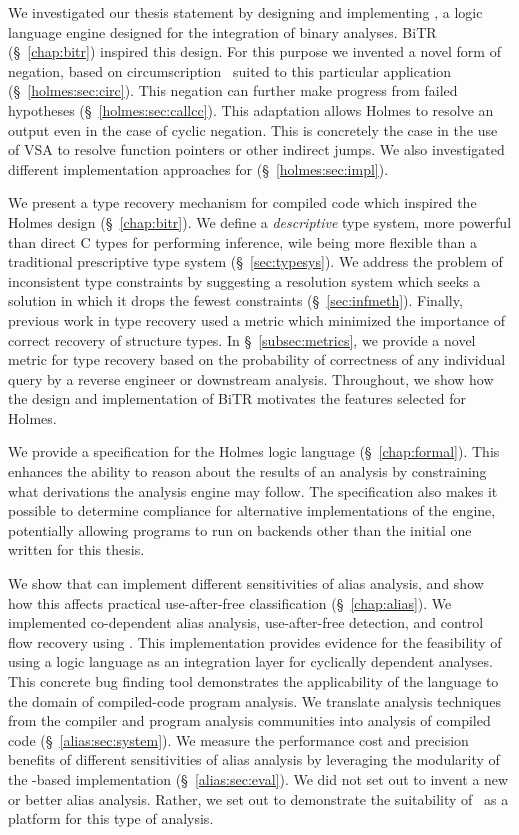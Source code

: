 We investigated our thesis statement by designing and implementing \sysname, a logic language engine designed for the integration of binary analyses.
BiTR (\S~\ref{chap:bitr}) inspired this design.
For this purpose we invented a novel form of negation, based on circumscription~\cite{circumscription} suited to this particular application (\S~\ref{holmes:sec:circ}).
This negation can further make progress from failed hypotheses (\S~\ref{holmes:sec:callcc}).
This adaptation allows Holmes to resolve an output even in the case of cyclic negation.
This is concretely the case in the use of VSA to resolve function pointers or other indirect jumps.
We also investigated different implementation approaches for \sysname (\S~\ref{holmes:sec:impl}).

We present a type recovery mechanism for compiled code which inspired the Holmes design (\S~\ref{chap:bitr}).
We define a \emph{descriptive} type system, more powerful than direct C types for performing inference, wile being more flexible than a traditional prescriptive type system (\S~\ref{sec:typesys}).
We address the problem of inconsistent type constraints by suggesting a resolution system which seeks a solution in which it drops the fewest constraints (\S~\ref{sec:infmeth}).
Finally, previous work in type recovery used a metric which minimized the importance of correct recovery of structure types.
In \S~\ref{subsec:metrics}, we provide a novel metric for type recovery based on the probability of correctness of any individual query by a reverse engineer or downstream analysis.
Throughout, we show how the design and implementation of BiTR motivates the features selected for Holmes.

We provide a specification for the Holmes logic language (\S~\ref{chap:formal}).
This enhances the ability to reason about the results of an analysis by constraining what derivations the analysis engine may follow.
The specification also makes it possible to determine compliance for alternative implementations of the engine, potentially allowing programs to run on backends other than the initial one written for this thesis.

We show that \sysname can implement different sensitivities of alias analysis, and show how this affects practical use-after-free classification (\S~\ref{chap:alias}).
We implemented co-dependent alias analysis, use-after-free detection, and control flow recovery using \sysname.
This implementation provides evidence for the feasibility of using a logic language as an integration layer for cyclically dependent analyses.
This concrete bug finding tool demonstrates the applicability of the \sysname language to the domain of compiled-code program analysis.
We translate analysis techniques from the compiler and program analysis communities into analysis of compiled code (\S~\ref{alias:sec:system}).
We measure the performance cost and precision benefits of different sensitivities of alias analysis by leveraging the modularity of the \sysname-based implementation (\S~\ref{alias:sec:eval}).
We did not set out to invent a new or better alias analysis.
Rather, we set out to demonstrate the suitability of \sysname\ as a platform for this type of analysis.
